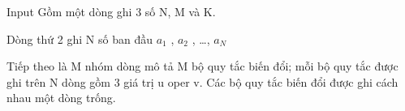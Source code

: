 Input  
Gồm một dòng ghi 3 số N, M và K.  

   Dòng thứ 2 ghi N số ban đầu $a_{1}$   , $a_{2}$   , …, $a_{N}$

    Tiếp theo là M nhóm dòng mô tả M bộ quy tắc biến đổi; mỗi bộ quy tắc được ghi trên N dòng gồm 3 giá trị u oper v. Các bộ quy tắc biến đổi được ghi cách nhau một dòng trống.